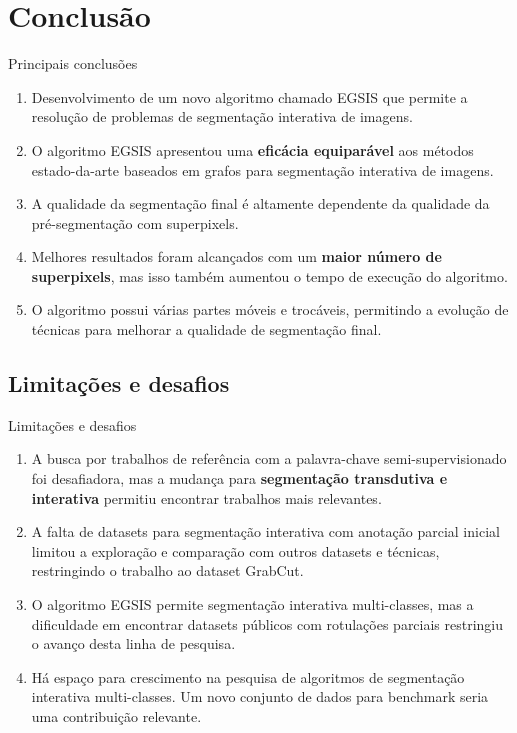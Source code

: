 \documentclass{templatebeamerufc/libs/ufc_format}
\begin{document}
\section{Conclusão}
\begin{frame}{Principais conclusões}
  \begin{enumerate}[<+->]

  \item Desenvolvimento de um novo algoritmo chamado EGSIS que permite
    a resolução de problemas de segmentação interativa de imagens.

  \item O algoritmo EGSIS apresentou uma \textbf{eficácia equiparável}
    aos métodos estado-da-arte baseados em grafos para segmentação
    interativa de imagens.

  \item A qualidade da segmentação final é altamente dependente da
    qualidade da pré-segmentação com superpixels.

  \item Melhores resultados foram alcançados com um \textbf{maior número de
    superpixels}, mas isso também aumentou o tempo de execução do
    algoritmo.

  \item O algoritmo possui várias partes móveis e trocáveis, permitindo a
    evolução de técnicas para melhorar a qualidade de segmentação final.

  \end{enumerate}
\end{frame}

\subsection{Limitações e desafios}
\begin{frame}{Limitações e desafios}
  \begin{enumerate}[<+->]
  \item A busca por trabalhos de referência com a palavra-chave
    semi-supervisionado foi desafiadora, mas a mudança para
    \textbf{segmentação transdutiva e interativa} permitiu encontrar trabalhos
    mais relevantes.

  \item A falta de datasets para segmentação interativa com anotação
    parcial inicial limitou a exploração e comparação com outros
    datasets e técnicas, restringindo o trabalho ao dataset GrabCut.

  \item O algoritmo EGSIS permite segmentação interativa
    multi-classes, mas a dificuldade em encontrar datasets públicos com rotulações
    parciais restringiu o avanço desta linha de pesquisa.

  \item Há espaço para crescimento na pesquisa de algoritmos de
    segmentação interativa multi-classes. Um novo conjunto de dados para
    benchmark seria uma contribuição relevante.

  \end{enumerate}
\end{frame}
\end{document}
